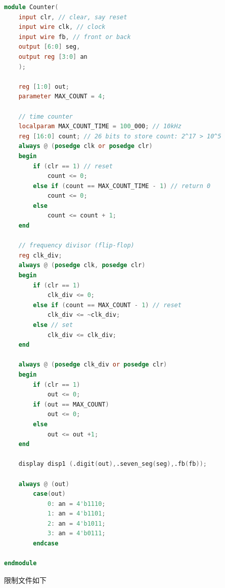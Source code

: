 \documentclass[11pt,UTF8]{ctexart}
\begin{document}
\begin{lstlisting}[language=Verilog]
module Counter(
    input clr, // clear, say reset
    input wire clk, // clock
    input wire fb, // front or back
    output [6:0] seg,
    output reg [3:0] an
    );

    reg [1:0] out;
    parameter MAX_COUNT = 4;
    
    // time counter
    localparam MAX_COUNT_TIME = 100_000; // 10kHz
    reg [16:0] count; // 26 bits to store count: 2^17 > 10^5
    always @ (posedge clk or posedge clr)
    begin
        if (clr == 1) // reset
            count <= 0;
        else if (count == MAX_COUNT_TIME - 1) // return 0
            count <= 0;
        else
            count <= count + 1;
    end

    // frequency divisor (flip-flop)
    reg clk_div;
    always @ (posedge clk, posedge clr)
    begin
        if (clr == 1)
            clk_div <= 0;
        else if (count == MAX_COUNT - 1) // reset
            clk_div <= ~clk_div;
        else // set
            clk_div <= clk_div;
    end

    always @ (posedge clk_div or posedge clr)
    begin
        if (clr == 1)
            out <= 0;
        if (out == MAX_COUNT)
            out <= 0;
        else
            out <= out +1;
    end

    display disp1 (.digit(out),.seven_seg(seg),.fb(fb));
    
    always @ (out)
        case(out)
            0: an = 4'b1110;
            1: an = 4'b1101;
            2: an = 4'b1011;
            3: an = 4'b0111;
        endcase

endmodule
\end{lstlisting}
\par 限制文件如下
\end{document}
